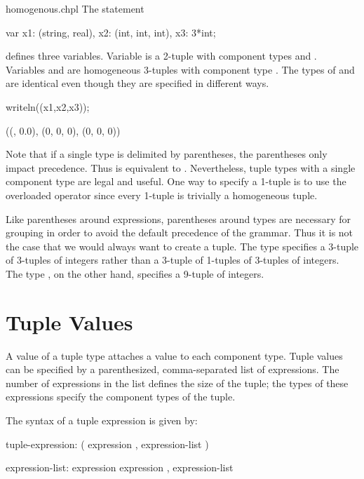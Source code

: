 \begin{chapelexample}{homogenous.chpl}
The statement
\begin{chapel}
var x1: (string, real),
    x2: (int, int, int),
    x3: 3*int;
\end{chapel}
defines three variables.  Variable  is a 2-tuple with
component types  and .  Variables 
and  are homogeneous 3-tuples with component type .
The types of  and  are identical even though they
are specified in different ways.
\begin{chapelpost}
writeln((x1,x2,x3));
\end{chapelpost}
\begin{chapeloutput}
((, 0.0), (0, 0, 0), (0, 0, 0))
\end{chapeloutput}
\end{chapelexample}

Note that if a single type is delimited by parentheses, the
parentheses only impact precedence.  Thus  is equivalent
to .  Nevertheless, tuple types with a single component type
are legal and useful.  One way to specify a 1-tuple is to use the
overloaded \chpl{*} operator since every 1-tuple is trivially a
homogeneous tuple.

\begin{rationale}
Like parentheses around expressions, parentheses around types are
necessary for grouping in order to avoid the default precedence of the
grammar.  Thus it is not the case that we would always want to create
a tuple.  The type  specifies a 3-tuple of 3-tuples of
integers rather than a 3-tuple of 1-tuples of 3-tuples of integers.
The type , on the other hand, specifies a 9-tuple of
integers.
\end{rationale}

\section{Tuple Values}
\label{Tuple_Values}

A value of a tuple type attaches a value to each component type.
Tuple values can be specified by a parenthesized, comma-separated list
of expressions.  The number of expressions in the list defines the
size of the tuple; the types of these expressions specify the
component types of the tuple.

The syntax of a tuple expression is given by:
\begin{syntax}
tuple-expression:
  ( expression , expression-list )

expression-list:
  expression
  expression , expression-list
\end{syntax}

